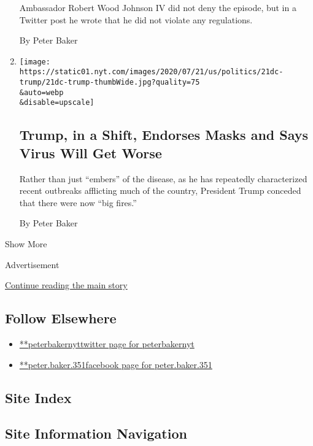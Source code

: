 \begin{enumerate}
  Ambassador Robert Wood Johnson IV did not deny the episode, but in a
  Twitter post he wrote that he did not violate any regulations.

  By Peter Baker
\item
  \href{/2020/07/21/us/politics/trump-coronavirus-masks.html}{}

  \texttt{[image: https://static01.nyt.com/images/2020/07/21/us/politics/21dc-trump/21dc-trump-thumbWide.jpg?quality=75\\\&auto=webp\\\&disable=upscale]}

  \hypertarget{trump-in-a-shift-endorses-masks-and-says-virus-will-get-worse}{%
  \subsection{Trump, in a Shift, Endorses Masks and Says Virus Will Get
  Worse}\label{trump-in-a-shift-endorses-masks-and-says-virus-will-get-worse}}

  Rather than just ``embers'' of the disease, as he has repeatedly
  characterized recent outbreaks afflicting much of the country,
  President Trump conceded that there were now ``big fires.''

  By Peter Baker
\end{enumerate}

Show More

Advertisement

\protect\hyperlink{after-mid2}{Continue reading the main story}

\hypertarget{follow-elsewhere}{%
\subsection{Follow Elsewhere}\label{follow-elsewhere}}

\begin{itemize}
\tightlist
\item
  \href{https://twitter.com/peterbakernyt}{**peterbakernyttwitter page
  for peterbakernyt}
\item
  \href{https://www.facebook.com/peter.baker.351}{**peter.baker.351facebook
  page for peter.baker.351}
\end{itemize}

\hypertarget{site-index}{%
\subsection{Site Index}\label{site-index}}

\hypertarget{site-information-navigation}{%
\subsection{Site Information
Navigation}\label{site-information-navigation}}

